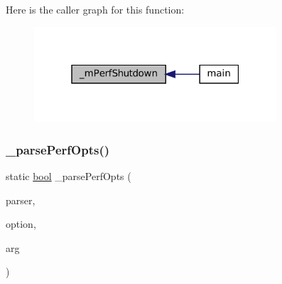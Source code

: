 Here is the caller graph for this function\+:
\nopagebreak
\begin{figure}[H]
\begin{center}
\leavevmode
\includegraphics[width=256pt]{perf-main_8c_ae03bb46043d38ba7457625ec193d25c9_icgraph}
\end{center}
\end{figure}
\mbox{\label{perf-main_8c_a95bd03ff14c9138daf9f88703ab5d5f7}} 
\subsubsection{\texorpdfstring{\+\_\+parse\+Perf\+Opts()}{\_parsePerfOpts()}}
{\footnotesize\ttfamily static \mbox{\hyperlink{libretro_8h_a4a26dcae73fb7e1528214a068aca317e}{bool}} \+\_\+parse\+Perf\+Opts (\begin{DoxyParamCaption}\item[{struct m\+Sub\+Parser $\ast$}]{parser,  }\item[{\mbox{\hyperlink{ioapi_8h_a787fa3cf048117ba7123753c1e74fcd6}{int}}}]{option,  }\item[{const char $\ast$}]{arg }\end{DoxyParamCaption})\hspace{0.3cm}{\ttfamily [static]}}

